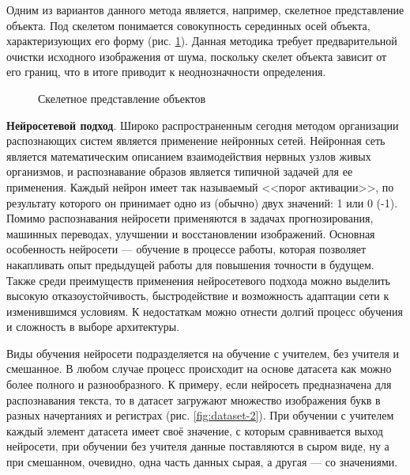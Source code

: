 Одним из вариантов данного метода является, например, скелетное представление объекта. Под скелетом понимается совокупность серединных осей объекта, характеризующих его форму (рис. \cref{fig:sklt}). Данная методика требует предварительной очистки исходного изображения от шума, поскольку скелет объекта зависит от его границ, что в итоге приводит к неоднозначности определения.

\begin{figure}[ht]
	\caption{Скелетное представление объектов}\label{fig:sklt}
\end{figure}

\textbf{Нейросетевой подход}. Широко распространенным сегодня методом организации распознающих систем является применение нейронных сетей. Нейронная сеть является математическим описанием взаимодействия нервных узлов живых организмов, и распознавание образов является типичной задачей для ее применения. Каждый нейрон имеет так называемый <<порог активации>>, по результату которого он принимает одно из (обычно) двух значений: 1 или 0 (-1). Помимо распознавания нейросети применяются в задачах прогнозирования, машинных переводах, улучшении и восстановлении изображений. Основная особенность нейросети --- обучение в процессе работы, которая позволяет накапливать опыт предыдущей работы для повышения точности в будущем. Также среди преимуществ применения нейросетевого подхода можно выделить высокую отказоустойчивость, быстродействие и возможность адаптации сети к изменившимся условиям. К недостаткам можно отнести долгий процесс обучения и сложность в выборе архитектуры.

Виды обучения нейросети подразделяется на обучение с учителем, без учителя и смешанное. В любом случае процесс происходит на основе датасета как можно более полного и разнообразного. К примеру, если нейросеть предназначена для распознавания текста, то в датасет загружают множество изображения букв в разных начертаниях и регистрах (рис. \cref{fig:dataset-2}). При обучении с учителем каждый элемент датасета имеет своё значение, с которым сравнивается выход нейросети, при обучении без учителя данные поставляются в сыром виде, ну а при смешанном, очевидно, одна часть данных сырая, а другая --- со значениями.

